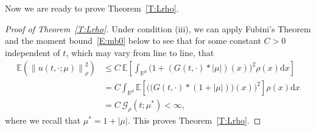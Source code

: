 \documentclass[a4paper,11pt]{article}%
\theoremstyle{plain}
\theoremstyle{definition}
\numberwithin{equation}{section}
\newcommand{\R}{\mathbb{R}}
\newcommand{\E}{\mathbb{E}}
\newcommand{\Norm}[1]{\left\| #1 \right\|}
\newcommand{\ud}{\ensuremath{\mathrm{d}}}
\begin{document}
Now we are ready to prove Theorem~\ref{T:Lrho}.

\begin{proof}[Proof of Theorem~\ref{T:Lrho}]
  Under condition (iii), we can apply Fubini's Theorem and the moment bound~\eqref{E:mb0} below to
  see that for some constant $C>0$ independent of $t$, which may vary from line to line, that
  \begin{align*}
    \E\left(\Norm{u(t,\cdot;\mu)}_{\rho}^2\right)
    & \le C\: \E \left[\int_{\R^d}\bigg(1+(G(t,\cdot) * |\mu|)(x)\bigg)^2\rho(x)\ud x\right] \\
    & = C \int_{\R^d}\E \left[\bigg(\Big(G(t,\cdot) *(1+|\mu|)\Big)(x) \bigg)^2\right]\rho(x)\ud x \\
    & = C \:\mathcal{G}_{\rho}(t;\mu^*) < \infty,
  \end{align*}
  where we recall that $\mu^* = 1+|\mu|$. This proves Theorem~\ref{T:Lrho}.
\end{proof}
\end{document}
